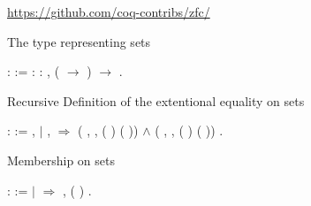 
\url{https://github.com/coq-contribs/zfc/}


The type representing sets

\begin{coqdoccode}
\coqdocnoindent
{}  :  :=\coqdoceol
\coqdocindent{2.00em}
 : \coqdockw{\ensuremath{\forall}}  : , ( \ensuremath{\rightarrow} ) \ensuremath{\rightarrow} .\coqdoceol
\coqdocemptyline
\end{coqdoccode}

Recursive Definition of the extentional equality on sets

\begin{coqdoccode}
      :  :=\coqdoceol
  \coqdocindent{2.00em}
   ,  \coqdoceol
  \coqdocindent{2.00em}
  \ensuremath{|}   ,    \ensuremath{\Rightarrow}\coqdoceol
  \coqdocindent{4.00em}
  (\coqdockw{\ensuremath{\forall}} , \coqdoctac{\ensuremath{\exists}} ,  ( ) ( )) \ensuremath{\land} (\coqdockw{\ensuremath{\forall}} , \coqdoctac{\ensuremath{\exists}} ,  ( ) ( ))\coqdoceol
  \coqdocindent{2.00em}
  .\coqdoceol
  \coqdocemptyline
\end{coqdoccode}

Membership on sets

\begin{coqdoccode}
  \coqdocnoindent
{}    :  :=\coqdoceol
\coqdocindent{1.00em}
  \coqdoceol
\coqdocindent{1.00em}
\ensuremath{|}    \ensuremath{\Rightarrow} \coqdoctac{\ensuremath{\exists}} ,   ( )\coqdoceol
\coqdocindent{1.00em}
.\coqdoceol
\coqdocemptyline
\end{coqdoccode}